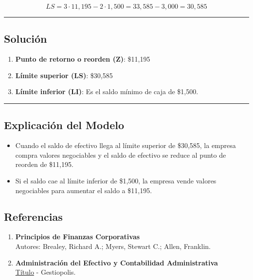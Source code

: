 \documentclass[
  letterpaper,
  DIV=11,
  numbers=noendperiod]{scrartcl}
\providecommand{\tightlist}{%
  \setlength{\itemsep}{0pt}\setlength{\parskip}{0pt}}\usepackage{longtable,booktabs,array}
\begin{document}
\[
LS = 3 \cdot 11,195 - 2 \cdot 1,500 = 33,585 - 3,000 = 30,585
\]

\begin{center}\rule{0.5\linewidth}{0.5pt}\end{center}

\subsection{Solución}\label{soluciuxf3n}

\begin{enumerate}
\def\labelenumi{\arabic{enumi}.}
\tightlist
\item
  \textbf{Punto de retorno o reorden (Z)}: \$11,195
\item
  \textbf{Límite superior (LS)}: \$30,585
\item
  \textbf{Límite inferior (LI)}: Es el saldo mínimo de caja de \$1,500.
\end{enumerate}

\begin{center}\rule{0.5\linewidth}{0.5pt}\end{center}

\subsection{Explicación del Modelo}\label{explicaciuxf3n-del-modelo}

\begin{itemize}
\item
  Cuando el saldo de efectivo llega al límite superior de \$30,585, la
  empresa compra valores negociables y el saldo de efectivo se reduce al
  punto de reorden de \$11,195.
\item
  Si el saldo cae al límite inferior de \$1,500, la empresa vende
  valores negociables para aumentar el saldo a \$11,195.
\end{itemize}

\subsection{Referencias}\label{referencias}

\begin{enumerate}
\def\labelenumi{\arabic{enumi}.}
\tightlist
\item
  \textbf{Principios de Finanzas Corporativas}\\
  Autores: Brealey, Richard A.; Myers, Stewart C.; Allen, Franklin.
\item
  \textbf{Administración del Efectivo y Contabilidad Administrativa}\\
  \href{https://www.gestiopolis.com/administracion-del-efectivo-y-contabilidad-administrativa/\#google_vignette}{Título}
  - Gestiopolis.
\end{enumerate}
\end{document}
